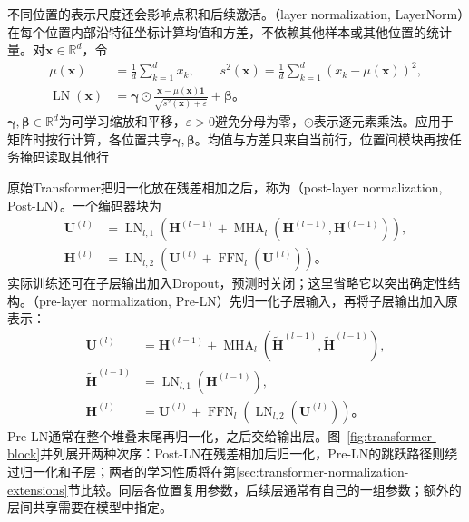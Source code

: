 不同位置的表示尺度还会影响点积和后续激活。（layer normalization, LayerNorm）在每个位置内部沿特征坐标计算均值和方差，不依赖其他样本或其他位置的统计量。对$\bm x\in\mathbb R^d$，令
\begin{equation}
  \begin{aligned}
    \mu(\bm x)&=\frac1d\sum_{k=1}^d x_k,\qquad
    s^2(\bm x)=\frac1d\sum_{k=1}^d(x_k-\mu(\bm x))^2,\\
    \operatorname{LN}(\bm x)
      &=\bm\gamma\odot
        \frac{\bm x-\mu(\bm x)\bm 1}{\sqrt{s^2(\bm x)+\varepsilon}}
        +\bm\beta\text{。}
  \end{aligned}
  \label{eq:transformer-layernorm}
\end{equation}
$\bm\gamma,\bm\beta\in\mathbb R^d$为可学习缩放和平移，$\varepsilon>0$避免分母为零，$\odot$表示逐元素乘法。应用于矩阵时按行计算，各位置共享$\bm\gamma,\bm\beta$。均值与方差只来自当前行，位置间模块再按任务掩码读取其他行

原始Transformer把归一化放在残差相加之后，称为（post-layer normalization, Post-LN）。一个编码器块为
\begin{equation}
  \begin{aligned}
    \bm U^{(l)}&=\operatorname{LN}_{l,1}\!\left(
       \bm H^{(l-1)}+\operatorname{MHA}_l(\bm H^{(l-1)},\bm H^{(l-1)})\right),\\
    \bm H^{(l)}&=\operatorname{LN}_{l,2}\!\left(
       \bm U^{(l)}+\operatorname{FFN}_l(\bm U^{(l)})\right)\text{。}
  \end{aligned}
  \label{eq:transformer-postln-block}
\end{equation}
实际训练还可在子层输出加入Dropout，预测时关闭；这里省略它以突出确定性结构。（pre-layer normalization, Pre-LN）先归一化子层输入，再将子层输出加入原表示：
\begin{equation}
  \begin{aligned}
    \bm U^{(l)}&=\bm H^{(l-1)}+
      \operatorname{MHA}_l(\widetilde{\bm H}^{(l-1)},\widetilde{\bm H}^{(l-1)}),\\
    \widetilde{\bm H}^{(l-1)}&=\operatorname{LN}_{l,1}(\bm H^{(l-1)}),\\
    \bm H^{(l)}&=\bm U^{(l)}+
      \operatorname{FFN}_l(\operatorname{LN}_{l,2}(\bm U^{(l)}))\text{。}
  \end{aligned}
  \label{eq:transformer-preln-block}
\end{equation}
Pre-LN通常在整个堆叠末尾再归一化，之后交给输出层。图~\ref{fig:transformer-block}并列展开两种次序：Post-LN在残差相加后归一化，Pre-LN的跳跃路径则绕过归一化和子层；两者的学习性质将在第\ref{sec:transformer-normalization-extensions}节比较。同层各位置复用参数，后续层通常有自己的一组参数；额外的层间共享需要在模型中指定。

